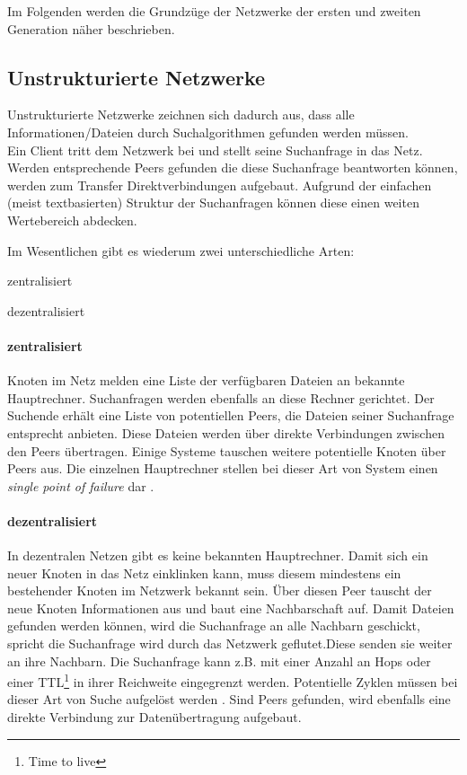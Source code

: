 Im Folgenden werden die Grundzüge der Netzwerke der ersten und zweiten Generation näher beschrieben.

\subsection{Unstrukturierte Netzwerke}
Unstrukturierte Netzwerke zeichnen sich dadurch aus, dass alle Informationen/Dateien durch Suchalgorithmen \cite{Lv2002} gefunden werden müssen. \\
Ein Client tritt dem Netzwerk bei und stellt seine Suchanfrage in das Netz. Werden entsprechende Peers gefunden die diese Suchanfrage beantworten können, werden zum Transfer Direktverbindungen aufgebaut. Aufgrund der einfachen (meist textbasierten) Struktur der Suchanfragen können diese einen weiten Wertebereich abdecken.

Im Wesentlichen gibt es wiederum zwei unterschiedliche Arten:
\begin{itemize*}
\item zentralisiert
\item dezentralisiert
\end{itemize*}

\paragraph{zentralisiert} Knoten im Netz melden eine Liste der verfügbaren Dateien an bekannte Hauptrechner. Suchanfragen werden ebenfalls an diese Rechner gerichtet. Der Suchende erhält eine Liste von potentiellen Peers, die Dateien seiner Suchanfrage entsprecht anbieten. Diese Dateien werden über direkte Verbindungen zwischen den Peers übertragen. Einige Systeme tauschen weitere potentielle Knoten über Peers aus. Die einzelnen Hauptrechner stellen bei dieser Art von System einen \emph{single point of failure} dar \cite{Eberspaecher2005}.

\paragraph{dezentralisiert} In dezentralen Netzen gibt es keine bekannten Hauptrechner. Damit sich ein neuer Knoten in das Netz einklinken kann, muss diesem mindestens ein bestehender Knoten im Netzwerk bekannt sein. Über diesen Peer tauscht der neue Knoten Informationen aus und baut eine Nachbarschaft auf. Damit Dateien gefunden werden können, wird die Suchanfrage an alle Nachbarn geschickt, spricht die Suchanfrage wird durch das Netzwerk geflutet.Diese senden sie weiter an ihre Nachbarn. Die Suchanfrage kann z.B. mit einer Anzahl an Hops oder einer TTL\footnote{Time to live} in ihrer Reichweite eingegrenzt werden. Potentielle Zyklen müssen bei dieser Art von Suche aufgelöst werden \cite{Lv2002}. Sind Peers gefunden, wird ebenfalls eine direkte Verbindung zur Datenübertragung aufgebaut. 

